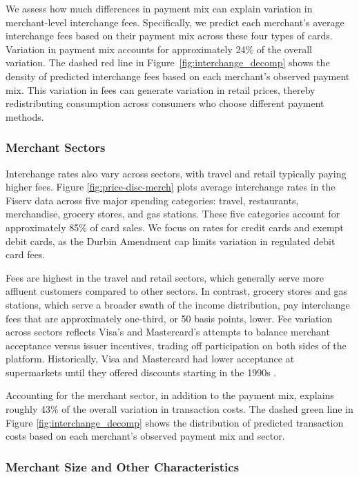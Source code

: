 \documentclass[11pt,english]{article}
\theoremstyle{remark}
\begin{document}
We assess how much differences in payment mix can explain variation in merchant-level interchange fees.
Specifically, we predict each merchant's average interchange fees based on their payment mix across these four types of cards.
Variation in payment mix accounts for approximately 24\% of the overall variation.
The dashed red line in Figure~\ref{fig:interchange_decomp} shows the density of predicted interchange fees based on each merchant's observed payment mix.
This variation in fees can generate variation in retail prices, thereby redistributing consumption across consumers who choose different payment methods.

\subsubsection{Merchant Sectors}

Interchange rates also vary across sectors, with travel and retail typically paying higher fees.
Figure \ref{fig:price-disc-merch} plots average interchange rates in the Fiserv data across five major spending categories: travel, restaurants, merchandise, grocery stores, and gas stations.
These five categories account for approximately 85\% of card sales.
We focus on rates for credit cards and exempt debit cards, as the Durbin Amendment cap limits variation in regulated debit card fees.

Fees are highest in the travel and retail sectors, which generally serve more affluent customers compared to other sectors.
In contrast, grocery stores and gas stations, which serve a broader swath of the income distribution, pay interchange fees that are approximately one-third, or 50 basis points, lower.
Fee variation across sectors reflects Visa's and Mastercard's attempts to balance merchant acceptance versus issuer incentives, trading off participation on both sides of the platform.
Historically, Visa and Mastercard had lower acceptance at supermarkets until they offered discounts starting in the 1990s \citep{Stearns2011}.

Accounting for the merchant sector, in addition to the payment mix, explains roughly 43\% of the overall variation in transaction costs.
The dashed green line in Figure \ref{fig:interchange_decomp} shows the distribution of predicted transaction costs based on each merchant's observed payment mix and sector. 

\subsubsection{Merchant Size and Other Characteristics}
\end{document}
